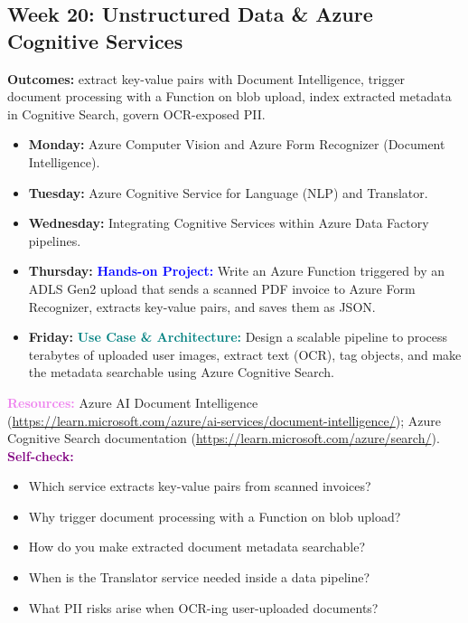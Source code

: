 \documentclass[11pt, a4paper]{article}
\newcommand{\project}[1]{\vspace{1mm}\noindent\textbf{\textcolor{blue}{Hands-on Project:}} #1}
\newcommand{\usecase}[1]{\vspace{1mm}\noindent\textbf{\textcolor{teal}{Use Case \& Architecture:}} #1}
\newcommand{\dayitem}[2]{\item \textbf{#1:} #2}
\newcommand{\resources}[1]{\vspace{1mm}\noindent\textbf{\textcolor{violet}{Resources:}} #1}
\newcommand{\selfcheck}[1]{\vspace{1mm}\noindent\textbf{\textcolor{purple}{Self-check:}} #1}
\begin{document}
\subsection*{Week 20: Unstructured Data \& Azure Cognitive Services}
\par\noindent\textbf{Outcomes:} extract key-value pairs with Document Intelligence, trigger document processing with a Function on blob upload, index extracted metadata in Cognitive Search, govern OCR-exposed PII.
\begin{itemize}[label=-]
    \dayitem{Monday}{Azure Computer Vision and Azure Form Recognizer (Document Intelligence).}
    \dayitem{Tuesday}{Azure Cognitive Service for Language (NLP) and Translator.}
    \dayitem{Wednesday}{Integrating Cognitive Services within Azure Data Factory pipelines.}
    \dayitem{Thursday}{\project{Write an Azure Function triggered by an ADLS Gen2 upload that sends a scanned PDF invoice to Azure Form Recognizer, extracts key-value pairs, and saves them as JSON.}}
    \dayitem{Friday}{\usecase{Design a scalable pipeline to process terabytes of uploaded user images, extract text (OCR), tag objects, and make the metadata searchable using Azure Cognitive Search.}}
\end{itemize}
\resources{Azure AI Document Intelligence (\url{https://learn.microsoft.com/azure/ai-services/document-intelligence/}); Azure Cognitive Search documentation (\url{https://learn.microsoft.com/azure/search/}).}
\selfcheck{\begin{itemize}[label=-, itemsep=0pt]
    \item Which service extracts key-value pairs from scanned invoices?
    \item Why trigger document processing with a Function on blob upload?
    \item How do you make extracted document metadata searchable?
    \item When is the Translator service needed inside a data pipeline?
    \item What PII risks arise when OCR-ing user-uploaded documents?
\end{itemize}}
\end{document}

